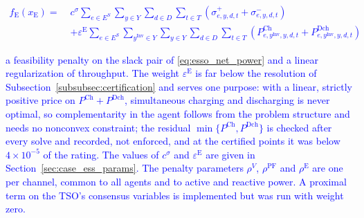 \textcolor{blue}{
    \begin{equation}
        \begin{aligned}
            f_{\text{E}}(x_{\text{E}}) = \;
            & c^{\sigma} \sum_{e \in E^S} \sum_{y \in Y} \sum_{d \in D} \sum_{t \in T}
            \left( \sigma^{+}_{e,y,d,t} + \sigma^{-}_{e,y,d,t} \right)\\
            & + \varepsilon^{\text{E}} \sum_{e \in E^S} \sum_{y^\text{Inv} \in Y} \sum_{y \in Y} \sum_{d \in D} \sum_{t \in T}
            \left( P^{\text{Ch}}_{e,y^\text{Inv},y,d,t} + P^{\text{Dch}}_{e,y^\text{Inv},y,d,t} \right)
        \end{aligned}
        \label{eq:esso_objective}
    \end{equation}
}

\noindent
\textcolor{blue}{
    a feasibility penalty on the slack pair of \eqref{eq:esso_net_power} and a linear regularization of throughput. The weight $\varepsilon^{\text{E}}$ is far below the resolution of Subsection~\ref{subsubsec:certification} and serves one purpose: with a linear, strictly positive price on $P^{\text{Ch}} + P^{\text{Dch}}$, simultaneous charging and discharging is never optimal, so complementarity in the agent follows from the problem structure and needs no nonconvex constraint; the residual $\min\{P^{\text{Ch}}, P^{\text{Dch}}\}$ is checked after every solve and recorded, not enforced, and at the certified points it was below $4 \times 10^{-5}$ of the rating. The values of $c^{\sigma}$ and $\varepsilon^{\text{E}}$ are given in Section~\ref{sec:case_ess_params}.
    The penalty parameters $\rho^{V}$, $\rho^{\text{PF}}$ and $\rho^{\text{E}}$ are one per channel, common to all agents and to active and reactive power. A proximal term on the TSO's consensus variables is implemented but was run with weight zero.
}



